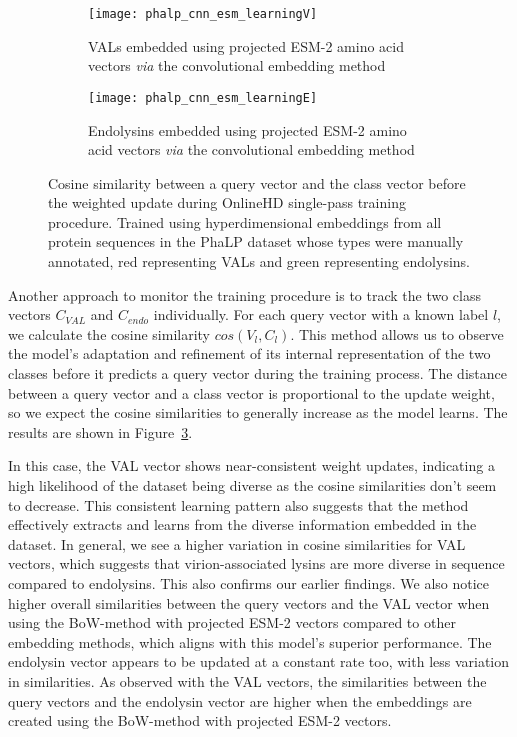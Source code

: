 \begin{figure}[htbp]
    \begin{subfigure}{0.48\textwidth}
        \texttt{[image: phalp\_cnn\_esm\_learningV]}
        \caption{VALs embedded using projected ESM-2 amino acid vectors \textit{via} the convolutional embedding method}
        \label{fig:subfig-g}
    \end{subfigure}
    \hfill
    \begin{subfigure}{0.48\textwidth}
        \texttt{[image: phalp\_cnn\_esm\_learningE]}
        \caption{Endolysins embedded using projected ESM-2 amino acid vectors \textit{via} the convolutional embedding method}
        \label{fig:subfig-h}
    \end{subfigure}
    
    \caption{Cosine similarity between a query vector and the class vector before the weighted update during OnlineHD single-pass training procedure. Trained using hyperdimensional embeddings from all protein sequences in the PhaLP dataset whose types were manually annotated, red representing VALs and green representing endolysins.}
    \label{fig:main}
\end{figure}

Another approach to monitor the training procedure is to track the two class vectors $C_{VAL}$ and $C_{endo}$ individually. For each query vector with a known label $l$, we calculate the cosine similarity $cos(V_{l}, C_{l})$. This method allows us to observe the model's adaptation and refinement of its internal representation of the two classes before it predicts a query vector during the training process. The distance between a query vector and a class vector is proportional to the update weight, so we expect the cosine similarities to generally increase as the model learns. The results are shown in Figure~\ref{fig:main}.

In this case, the VAL vector shows near-consistent weight updates, indicating a high likelihood of the dataset being diverse as the cosine similarities don't seem to decrease. This consistent learning pattern also suggests that the method effectively extracts and learns from the diverse information embedded in the dataset. In general, we see a higher variation in cosine similarities for VAL vectors, which suggests that virion-associated lysins are more diverse in sequence compared to endolysins. This also confirms our earlier findings. We also notice higher overall similarities between the query vectors and the VAL vector when using the BoW-method with projected ESM-2 vectors compared to other embedding methods, which aligns with this model's superior performance. The endolysin vector appears to be updated at a constant rate too, with less variation in similarities. As observed with the VAL vectors, the similarities between the query vectors and the endolysin vector are higher when the embeddings are created using the BoW-method with projected ESM-2 vectors.

